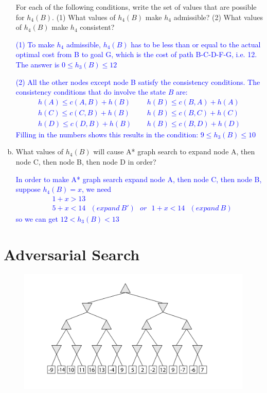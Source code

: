 \documentclass[a4paper]{article}
\begin{document}
\begin{enumerate}[(a)]
For each of the following conditions, write the set of values that are possible for $h_4(B)$. (1) What values of $h_4(B)$ make $h_4$ admissible? (2) What values of $h_4(B)$ make $h_4$ consistent?

\textcolor{blue}{ (1) To make $h_4$ admissible, $h_4(B)$ has to be less than or equal to the actual optimal cost from B to goal G, which is the cost of path B-C-D-F-G, i.e. 12.  The answer is $0 \leq h_3(B) \leq 12$}

\textcolor{blue}{
(2) All the other nodes except node B satisfy the consistency conditions. The consistency conditions that do
involve the state $B$ are:
\begin{align*}
h(A) \leq c(A, B) + h(B) \ \ \ & \ \ \ h(B) \leq c(B, A) + h(A)\\
h(C) \leq c(C, B) + h(B) \ \ \ & \ \ \ h(B) \leq c(B, C) + h(C)\\
h(D) \leq c(D, B) + h(B) \ \ \ & \ \ \ h(B) \leq c(B, D) + h(D)
\end{align*}
Filling in the numbers shows this results in the condition:
$9 \leq h_3(B) \leq 10$}

\item What values of $h_4(B)$ will cause A* graph search to expand node A, then node C, then node B, then node D in order?

\textcolor{blue}{
In order to make A* graph search expand node A, then node C, then node B, suppose $h_4(B) = x$, we need
\begin{align*}
&1+x>13 \\
&5+x<14 ~~~(expand~ B') ~~~ or ~~~ 1+x<14 ~~~ (expand~ B) 
\end{align*}
so we can get $12<h_3(B)<13$}

\end{enumerate}

\section{Adversarial Search}

\begin{center}
\begin{figure}[h!]
\centering
\includegraphics[width=1.25\textwidth]{figs/minmax}
\end{figure}
\end{center}
\end{document}
